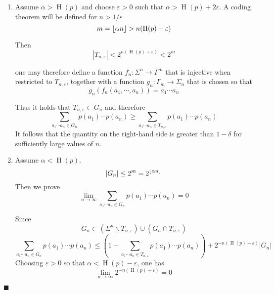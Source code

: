 \documentclass[aps,pra,onecolumn,notitlepage,superscriptaddress]{revtex4-1}
\DeclarePairedDelimiter{\floor}{\lfloor}{\rfloor}
\newcommand{\op}[1]{\operatorname{#1}}
\def\qed{$\blacksquare$ \newline}
\begin{document}
    \begin{enumerate}
        \item Assume $\alpha > \op H(p)$ and choose $\varepsilon > 0$ such that $\alpha > \op H(p) + 2\varepsilon$. A coding theorem will be defined for $n > 1/\varepsilon$
        \begin{equation*}
            m = \floor{\alpha n} > n(\op H(p) + \varepsilon)
        \end{equation*}

        Then
        \begin{equation*}
            |T_{n,\varepsilon}| < 2^{n(\op H(p) + \varepsilon)} < 2^m
        \end{equation*}

        one may therefore define a function $f_n : \Sigma^n \to \Gamma^m$ that is injective when restricted to $T_{n,\varepsilon}$, together with a function $g_n : \Gamma_m \to \Sigma_n$ that is chosen so that
        \begin{equation}
            g_n(f_n(a_1, \cdots, a_n)) = a_1 \cdots a_n
        \end{equation}

        Thus it holds that $T_{n,\varepsilon} \subset G_n$ and therefore
        \begin{equation}
            \sum_{a_1 \cdots a_n \in G_n} p(a_1)\cdots p(a_n) \geq \sum_{a_1 \cdots a_n \in T_{n,\varepsilon}} p(a_1) \cdots p(a_n)
        \end{equation}
        It follows that the quantity on the right-hand side is greater than $1 - \delta$ for sufficiently large values of $n$.

        \item Assume $\alpha < \op H(p)$.
        \begin{equation}
            |G_n| \leq 2^m = 2^{\floor{\alpha n}}
        \end{equation} 
        Then we prove
        \begin{equation}
            \lim_{n \to \infty} \sum_{a_1\cdots a_n \in G_n} p(a_1) \cdots p(a_n) = 0
        \end{equation}

        Since
        \begin{equation}
            G_n \subset (\Sigma^n \backslash T_{n,\varepsilon}) \cup (G_n \cap T_{n,\varepsilon})
        \end{equation}
        \begin{equation}
            \sum_{a_1\cdots a_n \in G_n} p(a_1) \cdots p(a_n) \leq
            \left( 1-\sum_{a_1\cdots a_n \in T_{n,\varepsilon}} p(a_1) \cdots p(a_n) \right) + 2^{-n(\op H(p) - \varepsilon)} |G_n|
        \end{equation}
        Choosing $\varepsilon > 0$ so that $\alpha < \op H(p) - \varepsilon$, one has
        \begin{equation}
            \lim_{n \to \infty} 2^{-n(\op H(p)-\varepsilon)} = 0
        \end{equation}
    \end{enumerate}
    \qed
\end{document}
